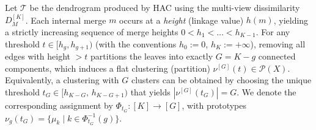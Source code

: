     Let \(\mathcal{T}\) be the dendrogram produced by HAC using the multi-view dissimilarity \(D_M^{[K]}\). Each internal merge \(m\) occurs at a \emph{height} (linkage value) \(h(m)\), yielding a strictly increasing sequence of merge heights \(0 < h_1 < \dots < h_{K-1}\). For any threshold \(t \in [h_g, h_{g+1})\) (with the conventions \(h_0:=0\), \(h_K:=+\infty\)), removing all edges with height \(> t\) partitions the leaves into exactly \(G=K-g\) connected components, which induces a flat clustering (partition) \(\nu^{[G]}(t) \in \mathcal{P}(X)\). Equivalently, a clustering with $G$ clusters can be obtained by choosing the unique threshold \(t_G \in [h_{K-G},\, h_{K-G+1})\) that yields \(|\nu^{[G]}(t_G)|=G\).
    We denote the corresponding assignment by \(\Phi_{t_G} : [K]\to [G]\), with prototypes \(\nu_g(t_G) = \{\mu_k \mid k\in \Phi_{t_G}^{-1}(g)\}\).






